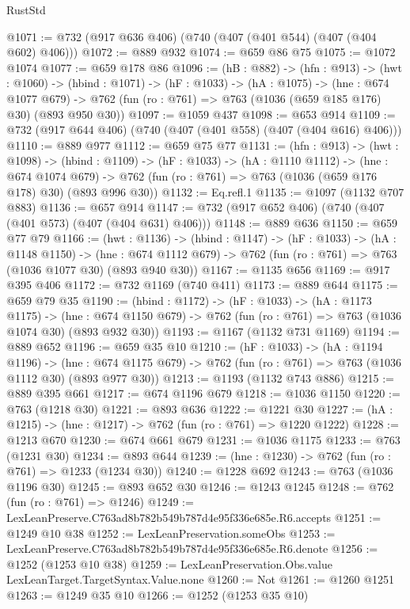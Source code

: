 \begin{lexlean}{RustStd}
\begin{coremodule}
@1071 := @732 (@917 @636 @406) (@740 (@407 (@401 @544) (@407 (@404 @602) @406)))
@1072 := @889 @932
@1074 := @659 @86 @75
@1075 := @1072 @1074
@1077 := @659 @178 @86
@1096 := (hB : @882) ->
  (hfn : @913) ->
  (hwt : @1060) ->
  (hbind : @1071) ->
  (hF : @1033) ->
  (hA : @1075) ->
  (hne : @674 @1077 @679) ->
  @762 (fun (ro : @761) => @763 (@1036 (@659 @185 @176) @30) (@893 @950 @30))
@1097 := @1059 @437
@1098 := @653 @914
@1109 := @732 (@917 @644 @406) (@740 (@407 (@401 @558) (@407 (@404 @616) @406)))
@1110 := @889 @977
@1112 := @659 @75 @77
@1131 := (hfn : @913) ->
  (hwt : @1098) ->
  (hbind : @1109) ->
  (hF : @1033) ->
  (hA : @1110 @1112) ->
  (hne : @674 @1074 @679) ->
  @762 (fun (ro : @761) => @763 (@1036 (@659 @176 @178) @30) (@893 @996 @30))
@1132 := Eq.refl.{1}
@1135 := @1097 (@1132 @707 @883)
@1136 := @657 @914
@1147 := @732 (@917 @652 @406) (@740 (@407 (@401 @573) (@407 (@404 @631) @406)))
@1148 := @889 @636
@1150 := @659 @77 @79
@1166 := (hwt : @1136) ->
  (hbind : @1147) ->
  (hF : @1033) ->
  (hA : @1148 @1150) ->
  (hne : @674 @1112 @679) -> @762 (fun (ro : @761) => @763 (@1036 @1077 @30) (@893 @940 @30))
@1167 := @1135 @656
@1169 := @917 @395 @406
@1172 := @732 @1169 (@740 @411)
@1173 := @889 @644
@1175 := @659 @79 @35
@1190 := (hbind : @1172) ->
  (hF : @1033) ->
  (hA : @1173 @1175) ->
  (hne : @674 @1150 @679) -> @762 (fun (ro : @761) => @763 (@1036 @1074 @30) (@893 @932 @30))
@1193 := @1167 (@1132 @731 @1169)
@1194 := @889 @652
@1196 := @659 @35 @10
@1210 := (hF : @1033) ->
  (hA : @1194 @1196) ->
  (hne : @674 @1175 @679) -> @762 (fun (ro : @761) => @763 (@1036 @1112 @30) (@893 @977 @30))
@1213 := @1193 (@1132 @743 @886)
@1215 := @889 @395 @661
@1217 := @674 @1196 @679
@1218 := @1036 @1150
@1220 := @763 (@1218 @30)
@1221 := @893 @636
@1222 := @1221 @30
@1227 := (hA : @1215) -> (hne : @1217) -> @762 (fun (ro : @761) => @1220 @1222)
@1228 := @1213 @670
@1230 := @674 @661 @679
@1231 := @1036 @1175
@1233 := @763 (@1231 @30)
@1234 := @893 @644
@1239 := (hne : @1230) -> @762 (fun (ro : @761) => @1233 (@1234 @30))
@1240 := @1228 @692
@1243 := @763 (@1036 @1196 @30)
@1245 := @893 @652 @30
@1246 := @1243 @1245
@1248 := @762 (fun (ro : @761) => @1246)
@1249 := LexLeanPreserve.C763ad8b782b549b787d4e95f336e685e.R6.accepts
@1251 := @1249 @10 @38
@1252 := LexLeanPreservation.someObs
@1253 := LexLeanPreserve.C763ad8b782b549b787d4e95f336e685e.R6.denote
@1256 := @1252 (@1253 @10 @38)
@1259 := LexLeanPreservation.Obs.value LexLeanTarget.TargetSyntax.Value.none
@1260 := Not
@1261 := @1260 @1251
@1263 := @1249 @35 @10
@1266 := @1252 (@1253 @35 @10)

\end{coremodule}
\end{lexlean}
